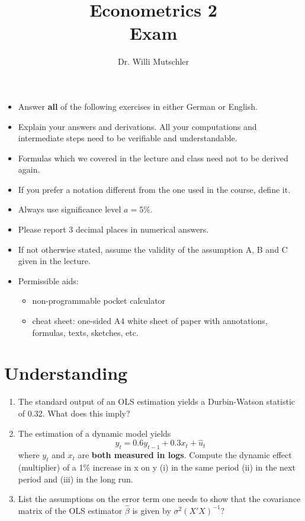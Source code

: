 \documentclass{article}
\begin{document}
	
	\title{Econometrics 2 \\ \small Exam}
	\author{Dr. Willi Mutschler}
	\date{}
	\maketitle
	
	\begin{itemize}
		\item Answer \textbf{all} of the following exercises in either German or English.
		\item Explain your answers and derivations. All your computations and intermediate steps need to be verifiable and understandable. 
		\item Formulas which we covered in the lecture and class need not to be derived again.
		\item If you prefer a notation different from the one used in the course, define it.
		\item Always use significance level $a=5\%$.
		\item Please report 3 decimal places in numerical answers.
		\item If not otherwise stated, assume the validity of the assumption A, B and C given in the lecture.
		\item Permissible aids:
		\begin{itemize}
			\item non-programmable pocket calculator
			\item cheat sheet: one-sided A4 white sheet of paper with annotations, formulas, texts, sketches, etc.
		\end{itemize}
	\end{itemize}
\thispagestyle{empty}

\newpage
\setcounter{page}{1}
\section{Understanding}
\begin{enumerate}[label=(\alph*)]
\item The standard output of an OLS estimation yields a Durbin-Watson statistic of 0.32. What does this imply?
\item The estimation of a dynamic model yields
$$y_t = 0.6 y_{t-1} + 0.3 x_t +\hat{u}_t$$
where $y_t$ and $x_t$ are \textbf{both measured in logs}. Compute the dynamic effect (multiplier) of a 1\% increase in x on y (i) in the same period (ii) in the next period and (iii) in the long run.
\item List the assumptions on the error term one needs to show that the covariance matrix of the OLS estimator $\hat{\beta}$ is given by $\sigma^2 (X'X)^{-1}$?
\end{enumerate}
\newpage
\end{document}
